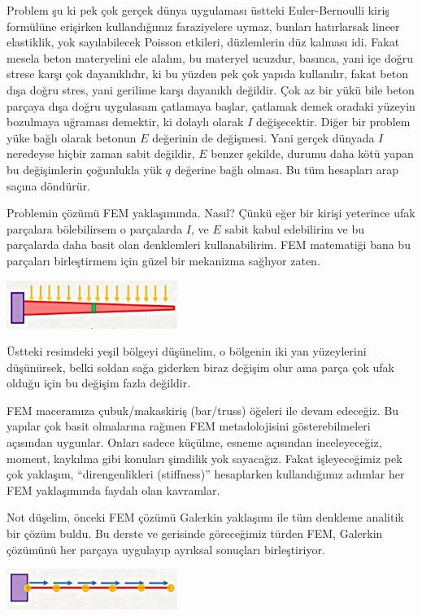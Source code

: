 \documentclass[12pt,fleqn]{article}\usepackage{../../common}
\begin{document}
Problem şu ki pek çok gerçek dünya uygulaması üstteki Euler-Bernoulli kiriş
formülüne erişirken kullandığımız faraziyelere uymaz, bunları hatırlarsak lineer
elastiklik, yok sayılabilecek Poisson etkileri, düzlemlerin düz kalması idi.
Fakat mesela beton materyelini ele alalım, bu materyel ucuzdur, basınca, yani
içe doğru strese karşı çok dayanıklıdır, ki bu yüzden pek çok yapıda kullanılır,
fakat beton dışa doğru stres, yani gerilime karşı dayanıklı değildir. Çok az bir
yükü bile beton parçaya dışa doğru uygulasam çatlamaya başlar, çatlamak demek
oradaki yüzeyin bozulmaya uğraması demektir, ki dolaylı olarak $I$
değişecektir. Diğer bir problem yüke bağlı olarak betonun $E$ değerinin de
değişmesi. Yani gerçek dünyada $I$ neredeyse hiçbir zaman sabit değildir, $E$
benzer şekilde, durumu daha kötü yapan bu değişimlerin çoğunlukla yük $q$
değerine bağlı olması. Bu tüm hesapları arap saçına döndürür.

Problemin çözümü FEM yaklaşımında. Nasıl? Çünkü eğer bir kirişi yeterince ufak
parçalara bölebilirsem o parçalarda $I$, ve $E$ sabit kabul edebilirim ve bu
parçalarda daha basit olan denklemleri kullanabilirim. FEM matematiği bana bu
parçaları birleştirmem için güzel bir mekanizma sağlıyor zaten.

\includegraphics[width=15em]{compscieng_bpp45fem2_02.jpg}

Üstteki resimdeki yeşil bölgeyi düşünelim, o bölgenin iki yan yüzeylerini
düşünürsek, belki soldan sağa giderken biraz değişim olur ama parça çok ufak
olduğu için bu değişim fazla değildir. 

FEM maceramıza çubuk/makaskiriş (bar/truss) öğeleri ile devam edeceğiz.  Bu
yapılar çok basit olmalarına rağmen FEM metadolojisini gösterebilmeleri
açısından uygunlar. Onları sadece küçülme, esneme açısından inceleyeceğiz,
moment, kaykılma gibi konuları şimdilik yok sayacağız. Fakat işleyeceğimiz pek
çok yaklaşım, ``direngenlikleri (stiffness)'' hesaplarken kullandığımız adımlar
her FEM yaklaşımında faydalı olan kavramlar.

Not düşelim, önceki FEM çözümü Galerkin yaklaşımı ile tüm denkleme analitik bir
çözüm buldu. Bu derste ve gerisinde göreceğimiz türden FEM, Galerkin çözümünü
her parçaya uygulayıp ayrıksal sonuçları birleştiriyor.

\includegraphics[width=15em]{compscieng_bpp45fem2_03.jpg}
\end{document}
